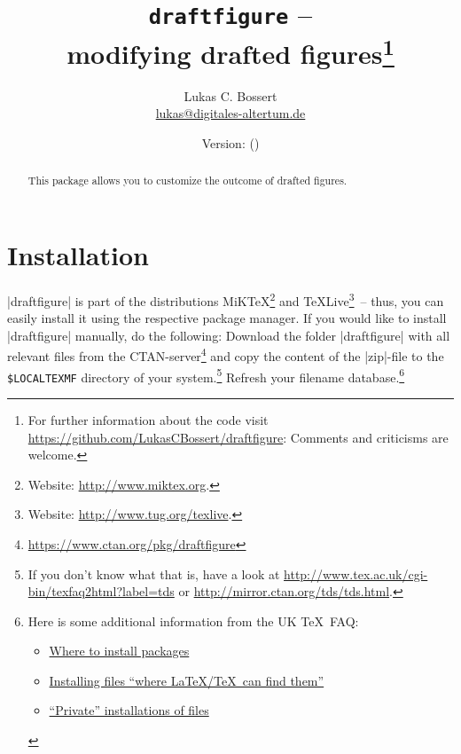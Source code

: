 \documentclass[a4paper,
12pt,
english
]{ltxdoc}
\newcommand\df{draftfigure\xspace}
\newcommand\dfstring{|draftfigure|\xspace}
\begin{document}
\title{\texttt{\df} -- \\ modifying drafted figures\footnote{%
For further information about the code visit \href{https://github.com/LukasCBossert/draftfigure}{https://github.com/LukasCBossert/draftfigure}: 
Comments and criticisms are welcome.}}
\author{Lukas C. Bossert\\{\small \href{mailto:lukas@digitales-altertum.de}{lukas@digitales-altertum.de}}}
\date{Version: \dfdate{} (\dfversion)} 
\maketitle

\begin{abstract}
\noindent This package allows you to customize the outcome of drafted figures.
\end{abstract}


\footnotesize\parskip=0mm \tableofcontents

\section{Installation}
\dfstring is part of the distributions MiK\TeX \footnote{Website: \url{http://www.miktex.org}.} 
and \TeX Live\footnote{Website: \url{http://www.tug.org/texlive}.}~-- thus, you
can easily install it using the respective package manager. 
If you would like to
install \dfstring manually, do the following:
Download the folder \dfstring with all relevant files from the CTAN-server\footnote{\url{https://www.ctan.org/pkg/\df}} and copy the content of the |zip|-file to the \texttt{\$LOCALTEXMF} directory of
 your system.\footnote{If you don't know what that is, have a look at
\url{http://www.tex.ac.uk/cgi-bin/texfaq2html?label=tds} or 
\url{http://mirror.ctan.org/tds/tds.html}.} 
Refresh your filename database.\footnote{ 
Here is some additional information from the UK \TeX\ FAQ:
\begin{itemize}[nosep,after=\vspace{-\baselineskip} ]
  \item \href{%
    http://www.tex.ac.uk/cgi-bin/texfaq2html?label=install-where}{%
    Where to install packages}
  \item \href{%
    http://www.tex.ac.uk/cgi-bin/texfaq2html?label=inst-wlcf}{%
    Installing files \enquote{where \LaTeX /TeX\ can find them}}
  \item \href{%
    http://www.tex.ac.uk/cgi-bin/texfaq2html?label=privinst}{%
    \enquote{Private} installations of files}
\end{itemize}
}
\end{document}
